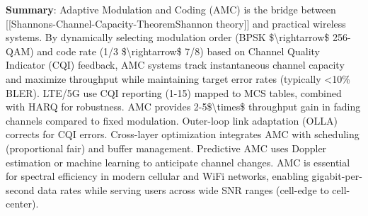 \textbf{Summary}: Adaptive Modulation and Coding (AMC) is the bridge
between
{[}{[}Shannon\textquotesingle s-Channel-Capacity-Theorem\textbar Shannon
theory{]}{]} and practical wireless systems. By dynamically selecting
modulation order (BPSK \$\textbackslash rightarrow\$ 256-QAM) and code
rate (1/3 \$\textbackslash rightarrow\$ 7/8) based on Channel Quality
Indicator (CQI) feedback, AMC systems track instantaneous channel
capacity and maximize throughput while maintaining target error rates
(typically \textless10\% BLER). LTE/5G use CQI reporting (1-15) mapped
to MCS tables, combined with HARQ for robustness. AMC provides
2-5\$\textbackslash times\$ throughput gain in fading channels compared
to fixed modulation. Outer-loop link adaptation (OLLA) corrects for CQI
errors. Cross-layer optimization integrates AMC with scheduling
(proportional fair) and buffer management. Predictive AMC uses Doppler
estimation or machine learning to anticipate channel changes. AMC is
essential for spectral efficiency in modern cellular and WiFi networks,
enabling gigabit-per-second data rates while serving users across wide
SNR ranges (cell-edge to cell-center).
